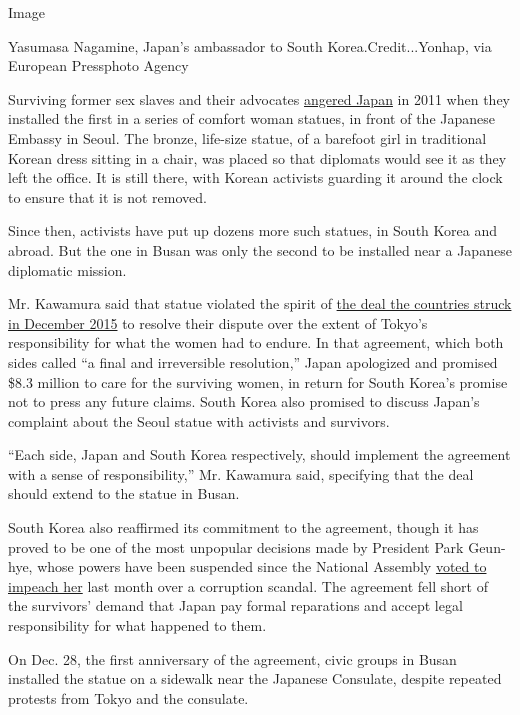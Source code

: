 Image

Yasumasa Nagamine, Japan's ambassador to South Korea.Credit...Yonhap,
via European Pressphoto Agency

Surviving former sex slaves and their advocates
\href{http://www.nytimes.com/2011/12/16/world/asia/statute-in-seoul-becomes-focal-point-of-dispute-between-south-korea-and-japan.html}{angered
Japan} in 2011 when they installed the first in a series of comfort
woman statues, in front of the Japanese Embassy in Seoul. The bronze,
life-size statue, of a barefoot girl in traditional Korean dress sitting
in a chair, was placed so that diplomats would see it as they left the
office. It is still there, with Korean activists guarding it around the
clock to ensure that it is not removed.

Since then, activists have put up dozens more such statues, in South
Korea and abroad. But the one in Busan was only the second to be
installed near a Japanese diplomatic mission.

Mr. Kawamura said that statue violated the spirit of
\href{http://www.nytimes.com/2015/12/29/world/asia/comfort-women-south-korea-japan.html}{the
deal the countries struck in December 2015} to resolve their dispute
over the extent of Tokyo's responsibility for what the women had to
endure. In that agreement, which both sides called ``a final and
irreversible resolution,'' Japan apologized and promised \$8.3 million
to care for the surviving women, in return for South Korea's promise not
to press any future claims. South Korea also promised to discuss Japan's
complaint about the Seoul statue with activists and survivors.

``Each side, Japan and South Korea respectively, should implement the
agreement with a sense of responsibility,'' Mr. Kawamura said,
specifying that the deal should extend to the statue in Busan.

South Korea also reaffirmed its commitment to the agreement, though it
has proved to be one of the most unpopular decisions made by President
Park Geun-hye, whose powers have been suspended since the National
Assembly
\href{http://www.nytimes.com/2016/12/09/world/asia/south-korea-president-park-geun-hye-impeached.html}{voted
to impeach her} last month over a corruption scandal. The agreement fell
short of the survivors' demand that Japan pay formal reparations and
accept legal responsibility for what happened to them.

On Dec. 28, the first anniversary of the agreement, civic groups in
Busan installed the statue on a sidewalk near the Japanese Consulate,
despite repeated protests from Tokyo and the consulate.

